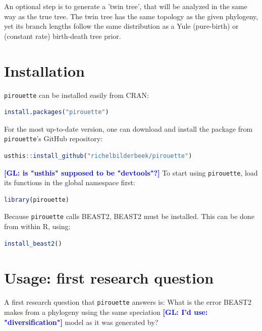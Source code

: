 \documentclass{article}
\newcommand{\giovanni}[1]{\textcolor{blue}{\textbf{[GL: #1]}}}
\begin{document}
An optional step is to generate a 'twin tree', that will be
analyzed in the same way as the true tree. The twin tree has the same
topology as the given phylogeny, yet its branch lengths follow the same
distribution as a Yule (pure-birth) or (constant rate) birth-death tree prior.

\section{Installation}

\verb;pirouette; can be installed easily from CRAN:

\begin{lstlisting}[language=R, floatplacement=H]
install.packages("pirouette")
\end{lstlisting}

For the most up-to-date version, 
one can download and install the package from \verb;pirouette;'s GitHub repository:

\begin{lstlisting}[language=R, floatplacement=H]
usthis::install_github("richelbilderbeek/pirouette")
\end{lstlisting}
\giovanni{is "usthis" supposed to be "devtools"?}
To start using \verb;pirouette;, load its functions in the global namespace first:

\begin{lstlisting}[language=R, floatplacement=H]
library(pirouette)
\end{lstlisting}
Because \verb;pirouette; calls BEAST2, BEAST2 must be installed. 
This can be done from within R, using:

\begin{lstlisting}[language=R, floatplacement=H]
install_beast2()
\end{lstlisting}


\section{Usage: first research question}

A first research question that \verb;pirouette; answers is:
What is the error BEAST2 makes from a phylogeny using the same 
speciation \giovanni{I'd use: "diversification"} model as it was generated by?
\end{document}
